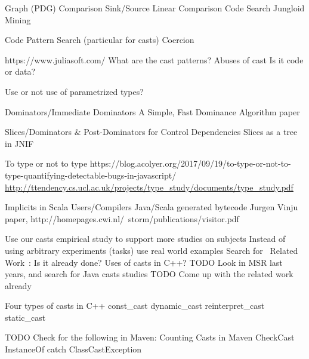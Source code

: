 Graph (PDG) Comparison
Sink/Source
Linear Comparison
Code Search
Jungloid Mining

Code Pattern Search (particular for casts)
Coercion

https://www.juliasoft.com/
What are the cast patterns?
Abuses of cast
Is it code or data?

Use or not use of parametrized types?

Dominators/Immediate Dominators
A Simple, Fast Dominance Algorithm paper



Slices/Dominators \& Post-Dominators for Control Dependencies
Slices as a tree in JNIF

To type or not to type
https://blog.acolyer.org/2017/09/19/to-type-or-not-to-type-quantifying-detectable-bugs-in-javascript/
\url{http://ttendency.cs.ucl.ac.uk/projects/type_study/documents/type_study.pdf}

Implicits in Scala
Users/Compilers Java/Scala generated bytecode
Jurgen Vinju paper, http://homepages.cwi.nl/~storm/publications/visitor.pdf

Use our casts empirical study to support more studies on subjects
Instead of using arbitrary experiments (tasks) use real world examples
Search for ~Related Work~: Is it already done?
Uses of casts in C++?
TODO Look in MSR last years, and search for Java casts studies 
TODO Come up with the related work already

Four types of casts in C++
const\_cast
dynamic\_cast
reinterpret\_cast
static\_cast

TODO Check for the following in Maven:
Counting Casts in Maven
CheckCast
InstanceOf
catch ClassCastException

